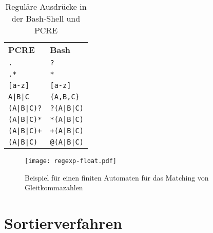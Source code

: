 \begin{table}[htb]
\centering\begin{tabular}{ll}
	\textbf{PCRE}     & \textbf{Bash}      \\
	\texttt{.}        & \texttt{?}         \\
	\texttt{.*}       & \texttt{*}         \\
	\texttt{[a-z]}    & \texttt{[a-z]}     \\
	\texttt{A|B|C}    & \texttt{\{A,B,C\}} \\
	\texttt{(A|B|C)?} & \texttt{?(A|B|C)}  \\
	\texttt{(A|B|C)*} & \texttt{*(A|B|C)}  \\
	\texttt{(A|B|C)+} & \texttt{+(A|B|C)}  \\
	\texttt{(A|B|C)}  & \texttt{@(A|B|C)}
\end{tabular}

\caption{Reguläre Ausdrücke in der Bash-Shell und PCRE}
\end{table}

\begin{figure}[htb]
\centering
\texttt{[image: regexp-float.pdf]}

\caption{Beispiel für einen finiten Automaten für das Matching von Gleitkommazahlen}
\end{figure}



\chapter{Sortierverfahren}

